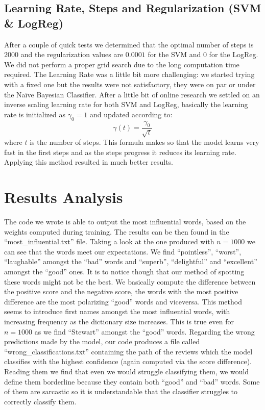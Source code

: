 \documentclass[10pt,a4paper]{report}
\begin{document}
\subsection{Learning Rate, Steps and Regularization (SVM \& LogReg)}
After a couple of quick tests we determined that the optimal number of steps is $2000$ and the regularization values are $0.0001$ for the SVM and $0$ for the LogReg. We did not perform a proper grid search due to the long computation time required. The Learning Rate was a little bit more challenging: we started trying with a fixed one but the results were not satisfactory, they were on par or under the Na\"{i}ve Bayesian Classifier. After a little bit of online research we settled on an inverse scaling learning rate for both SVM and LogReg, basically the learning rate is initialized as $\gamma_0=1$ and updated according to:
\begin{equation}
\gamma(t)=\frac{\gamma_0}{\sqrt{t}}
\end{equation}
where $t$ is the number of steps. This formula makes so that the model learns very fast in the first steps and as the steps progress it reduces its learning rate. Applying this method resulted in much better results. 
\section{Results Analysis}
The code we wrote is able to output the most influential words, based on the weights computed during training. The results can be then found in the \enquote{most\_influential.txt} file. Taking a look at the one produced with $n=1000$ we can see that the words meet our expectations. We find \enquote{pointless}, \enquote{worst}, \enquote{laughable} amongst the \enquote{bad} words and \enquote{superb}, \enquote{delightful} and \enquote{excellent} amongst the \enquote{good} ones. It is to notice though that our method of spotting these words might not be the best. We basically compute the difference between the positive score and the negative score, the words with the most positive difference are the most polarizing \enquote{good} words and viceversa. This method seems to introduce first names amongst the most influential words, with increasing frequency as the dictionary size increases. This is true even for $n=1000$ as we find \enquote{Stewart} amongst the \enquote{good} words. Regarding the wrong predictions made by the model, our code produces a file called \enquote{wrong\_classifications.txt} containing the path of the reviews which the model classifies with the highest confidence (again computed via the score difference). Reading them we find that even we would struggle classifying them, we would define them borderline because they contain both \enquote{good} and \enquote{bad} words. Some of them are sarcastic so it is understandable that the classifier struggles to correctly classify them.
\end{document}
